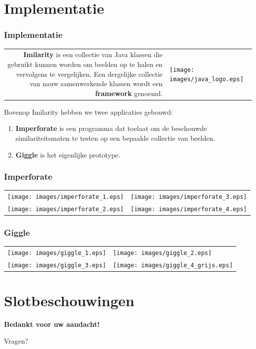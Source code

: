 \documentclass[dutch]{beamer}
\theoremstyle{definition}
\theoremstyle{remark}
\theoremstyle{example}
\begin{document}
\section{Implementatie}
\frame
{
  \frametitle{Implementatie}
  
  \begin{center}
  \begin{tabular}{@{}rl@{}}
  \begin{minipage}{0.8\textwidth}
  \raggedright
  \textbf{Imilarity} is een collectie van Java klassen die gebruikt kunnen worden om 
  beelden op te halen en vervolgens te vergelijken. Een dergelijke collectie van nauw 
  samenwerkende klassen wordt een \textbf{framework} genoemd. 
  \end{minipage} &
  \begin{minipage}{0.2\textwidth}
  \centering
  \texttt{[image: images/java\_logo.eps]}
  \end{minipage}
  \end{tabular}
  \end{center}
  
  Bovenop Imilarity hebben we twee applicaties gebouwd:
  \begin{enumerate}
    \item \textbf{Imperforate} is een programma dat toelaat om de beschouwde 
    similariteitsmaten te testen op een bepaalde collectie van beelden.
    \item \textbf{Giggle} is het eigenlijke prototype.
  \end{enumerate}
}
\frame
{
  \frametitle{Imperforate}
  
  \centering
  \begin{tabular}{@{}rl@{}}
  \texttt{[image: images/imperforate\_1.eps]} &
  \texttt{[image: images/imperforate\_3.eps]} \vspace{8pt}\\
  \texttt{[image: images/imperforate\_2.eps]} &
  \texttt{[image: images/imperforate\_4.eps]}
  \end{tabular}
}
\frame
{
  \frametitle{Giggle}
  
  \centering
  \begin{tabular}{@{}rl@{}}
  \texttt{[image: images/giggle\_1.eps]} &
  \texttt{[image: images/giggle\_2.eps]} \vspace{8pt}\\
  \texttt{[image: images/giggle\_3.eps]} &
  \texttt{[image: images/giggle\_4\_grijs.eps]}
  \end{tabular}
}

\section{Slotbeschouwingen}



\plainframe
{
  \begin{center}
  \Huge \textbf{\color{white}Bedankt voor uw aandacht!}
  \end{center}
  \vspace{10pt}
  \begin{center}
  \LARGE Vragen?
  \end{center}
}
\end{document}
